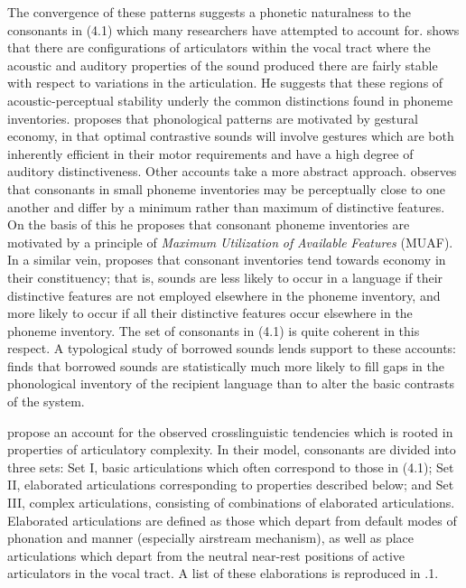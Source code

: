   The convergence of these patterns suggests a phonetic naturalness to the consonants in (4.1) which many researchers have attempted to account for. \citet{Stevens1989} shows that there are configurations of articulators within the vocal tract where the acoustic and auditory properties of the sound produced there are fairly stable with respect to variations in the articulation. He suggests that these regions of acoustic-perceptual stability underly the common distinctions found in phoneme inventories. \citet{Maddieson1996} proposes that phonological patterns are motivated by gestural economy, in that optimal contrastive sounds will involve gestures which are both inherently efficient in their motor requirements and have a high degree of auditory distinctiveness. Other accounts take a more abstract approach. \citet{Ohala1979} observes that consonants in small phoneme inventories may be perceptually close to one another and differ by a minimum rather than maximum of distinctive features. On the basis of this he proposes that consonant phoneme inventories are motivated by a principle of \textit{Maximum} \textit{Utilization} \textit{of} \textit{Available} \textit{Features} (MUAF). In a similar vein, \citet{Clements2003} proposes that consonant inventories tend towards economy in their constituency; that is, sounds are less likely to occur in a language if their distinctive features are not employed elsewhere in the phoneme inventory, and more likely to occur if all their distinctive features occur elsewhere in the phoneme inventory. The set of consonants in (4.1) is quite coherent in this respect. A typological study of borrowed sounds lends support to these accounts: \citet{Maddieson1985} finds that borrowed sounds are statistically much more likely to fill gaps in the phonological inventory of the recipient language than to alter the basic contrasts of the system.

  \citet{LindblomMaddieson1988} propose an account for the observed crosslinguistic tendencies which is rooted in properties of articulatory complexity. In their model, consonants are divided into three sets: Set I, basic articulations which often correspond to those in (4.1); Set II, elaborated articulations corresponding to properties described below; and Set III, complex articulations, consisting of combinations of elaborated articulations. Elaborated articulations are defined as those which depart from default modes of phonation and manner (especially airstream mechanism), as well as place articulations which depart from the neutral near-rest positions of active articulators in the vocal tract. A list of these elaborations is reproduced in .1.

